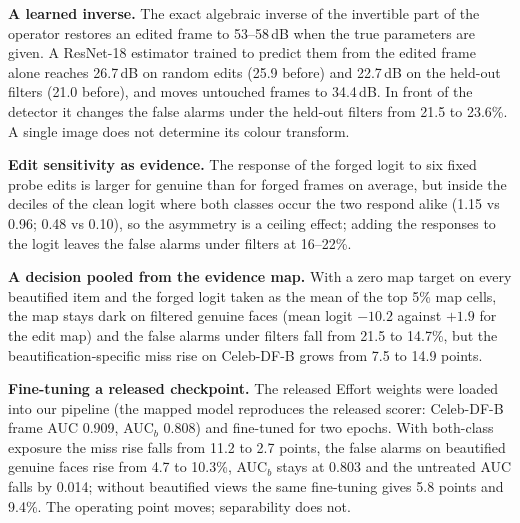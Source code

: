 \documentclass[10pt]{article}
\begin{document}
\textbf{A learned inverse.} The exact algebraic inverse of the invertible part of the operator restores an edited frame to
53--58\,dB when the true parameters are given. A ResNet-18 estimator trained to predict them from the edited frame alone reaches
26.7\,dB on random edits (25.9 before) and 22.7\,dB on the held-out filters (21.0 before), and moves untouched frames to 34.4\,dB. In
front of the detector it changes the false alarms under the held-out filters from 21.5 to 23.6\%. A single image does not determine
its colour transform.

\textbf{Edit sensitivity as evidence.} The response of the forged logit to six fixed probe edits is larger for genuine than for
forged frames on average, but inside the deciles of the clean logit where both classes occur the two respond alike (1.15 vs 0.96;
0.48 vs 0.10), so the asymmetry is a ceiling effect; adding the responses to the logit leaves the false alarms under filters at
16--22\%.

\textbf{A decision pooled from the evidence map.} With a zero map target on every beautified item and the forged logit taken as the
mean of the top 5\% map cells, the map stays dark on filtered genuine faces (mean logit $-10.2$ against $+1.9$ for the edit map) and
the false alarms under filters fall from 21.5 to 14.7\%, but the beautification-specific miss rise on Celeb-DF-B grows from 7.5 to
14.9 points.

\textbf{Fine-tuning a released checkpoint.} The released Effort weights were loaded into our pipeline (the mapped model reproduces the
released scorer: Celeb-DF-B frame AUC 0.909, AUC$_b$ 0.808) and fine-tuned for two epochs. With both-class exposure the miss rise
falls from 11.2 to 2.7 points, the false alarms on beautified genuine faces rise from 4.7 to 10.3\%, AUC$_b$ stays at 0.803 and the
untreated AUC falls by 0.014; without beautified views the same fine-tuning gives 5.8 points and 9.4\%. The operating point moves;
separability does not.
\end{document}
